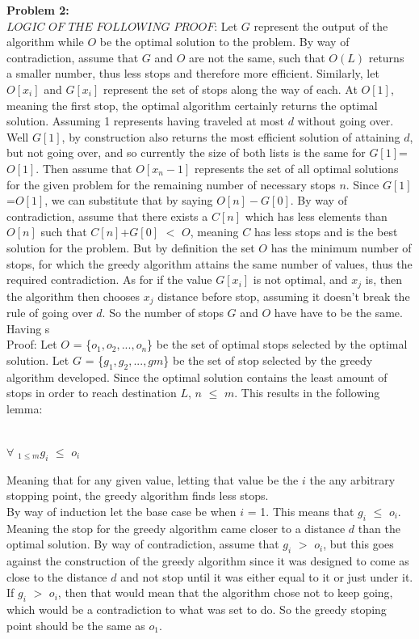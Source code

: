 \documentclass{article}
\begin{document}
\textbf{Problem 2:}\\
$LOGIC$ $OF$ $THE$ $FOLLOWING$ $PROOF$: Let $G$ represent the output of the algorithm while $O$ be the optimal solution to the problem. By way of contradiction, assume that $G$ and $O$ are not the same, such that $O(L)$ returns a smaller number, thus less stops and therefore more efficient. Similarly, let $O[x_i]$ and $G[x_i]$ represent the set of stops along the way of each. At $O[1]$, meaning the first stop, the optimal algorithm certainly returns the optimal solution. Assuming 1 represents having traveled at most $d$ without going over. Well $G[1]$, by construction also returns the most efficient solution of attaining $d$, but not going over, and so currently the size of both lists is the same for  $G[1]$=$O[1]$. Then assume that $O[x_n-1]$ represents the set of all optimal solutions for the given problem for the remaining number of necessary stops $n$. Since $G[1]$=$O[1]$, we can substitute that by saying $O[n]-G[0]$. By way of contradiction, assume that there exists a $C[n]$ which has less elements than $O[n]$ such that $C[n]$+$G[0]$ $<$ $O$, meaning $C$ has less stops and is the best solution for the problem. But by definition the set $O$ has the minimum number of stops, for which the greedy algorithm attains the same number of values, thus the required contradiction. As for if the value $G[x_i]$ is not optimal, and $x_j$ is, then the algorithm then chooses $x_j$ distance before stop, assuming it doesn't break the rule of going over $d$. So the number of stops $G$ and $O$ have have to be the same. 
Having s\\
Proof: Let $O$ = \{$o_1, o_2,...,o_{n}$\} be the set of optimal stops selected by the optimal solution. Let $G$ = \{$g_1,g_2,...,g{m}$\} be the set of stop selected by the greedy algorithm developed. Since the optimal solution contains the least amount of stops in order to reach destination $L$, $n$ $\leq$ $m$. This results in the following lemma:\\\
\begin{center}
$\forall$ $_{1 \leq m}g_i$ $\leq$ $o_i$
\end{center}
Meaning that for any given value, letting that value be the $i$ the any arbitrary stopping point, the greedy algorithm finds less stops.\\

By way of induction let the base case be when $i$ = 1. This means that $g_i$ $\leq$ $o_i$. Meaning the stop for the greedy algorithm came closer to a distance $d$ than the optimal solution. By way of contradiction, assume that $g_i$ $>$ $o_i$, but this goes against the construction of the greedy algorithm since it was designed to come as close to the distance $d$ and not stop until it was either equal to it or just under it. If $g_i$ $>$ $o_i$, then that would mean that the algorithm chose not to keep going, which would be a contradiction to what was set to do. So the greedy stoping point should be the same as $o_1$.\\
\end{document}
